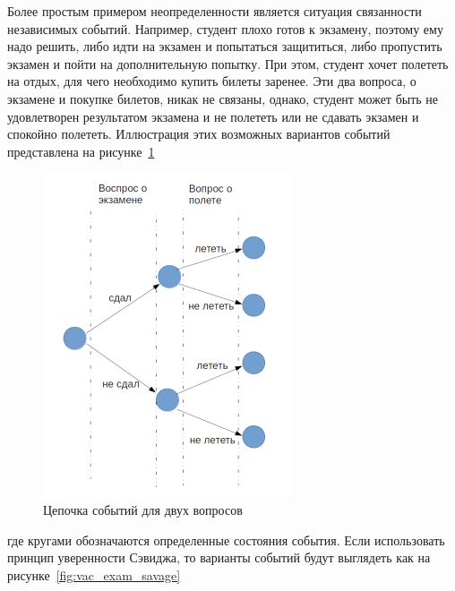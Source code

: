 Более простым примером неопределенности является ситуация связанности независимых событий. Например,
студент плохо готов к экзамену, поэтому ему надо решить, либо идти на экзамен и попытаться
защититься, либо пропустить экзамен и пойти на дополнительную попытку. При этом, студент хочет
полететь на отдых, для чего необходимо купить билеты заренее. Эти два вопроса, о экзамене и покупке
билетов, никак не связаны, однако, студент может быть не удовлетворен результатом экзамена и не полететь
или не сдавать экзамен и спокойно полететь. Иллюстрация этих возможных вариантов событий представлена
на рисунке~\ref{fig:vac_exam}

\newpage
\begin{figure}[h!]
    \centering
    \captionsetup{justification=centering}
    \includegraphics[width=0.35\linewidth]{pictures/vacation_and_exam.png}
    \caption{Цепочка событий для двух вопросов~\citep{shafir199228thinking}}
    \label{fig:vac_exam}
\end{figure}
где кругами обозначаются определенные состояния события. Если использовать принцип уверенности Сэвиджа,
то варианты событий будут выглядеть как на рисунке~\ref{fig:vac_exam_savage}

